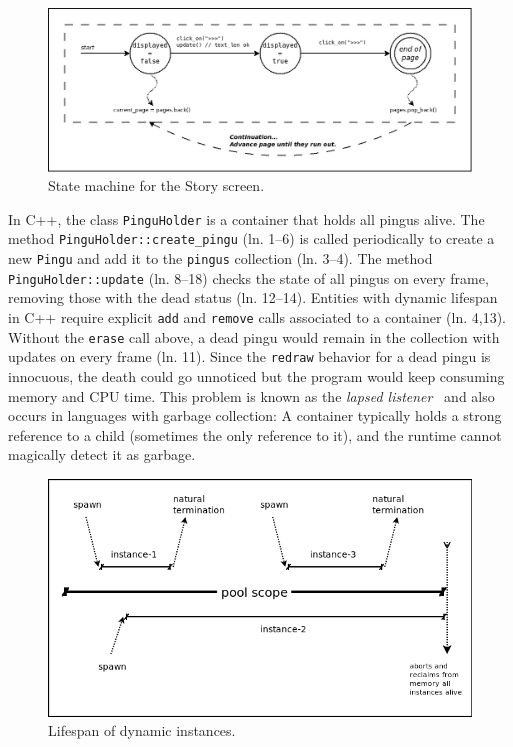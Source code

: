 \documentclass{vgtc}                          %
\newcommand{\code}[1] {{\small{\texttt{#1}}}}
\begin{document}
\begin{figure}
\centering
\includegraphics[width=\columnwidth]{story}
\caption{State machine for the Story screen.
\label{fig.story}
}
\end{figure}

In C++, the class \code{PinguHolder} is a container that holds all pingus
alive.
%
The method \code{PinguHolder::create\_pingu} (ln. 1--6) is called periodically
to create a new \code{Pingu} and add it to the \code{pingus} collection
(ln. 3--4).
The method \code{PinguHolder::update} (ln. 8--18) checks the state of all
pingus on every frame, removing those with the dead status (ln. 12--14).
%
Entities with dynamic lifespan in C++ require explicit \code{add} and
\code{remove} calls associated to a container (ln. 4,13).
Without the \code{erase} call above, a dead pingu would remain in the
collection with updates on every frame (ln. 11).
Since the \code{redraw} behavior for a dead pingu is innocuous, the death could
go unnoticed but the program would keep consuming memory and CPU time.
This problem is known as the \emph{lapsed listener}~\cite{TODO} and also occurs
in languages with garbage collection:
A container typically holds a strong reference to a child (sometimes the only 
reference to it), and the runtime cannot magically detect it as garbage.

\begin{figure}
\centering
\includegraphics[width=\columnwidth]{pool}
\caption{Lifespan of dynamic instances.
\label{fig.pool}
}
\end{figure}
\end{document}
